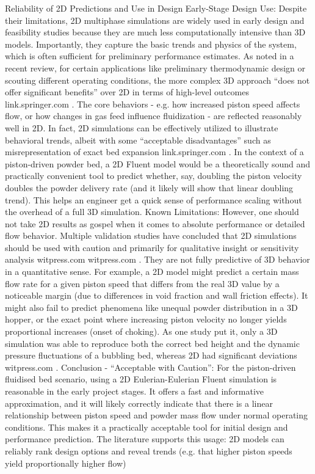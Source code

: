 Reliability of 2D Predictions and Use in Design
Early-Stage Design Use: Despite their limitations, 2D multiphase simulations are widely used in early design and feasibility studies because they are much less computationally intensive than 3D models. Importantly, they capture the basic trends and physics of the system, which is often sufficient for preliminary performance estimates. As noted in a recent review, for certain applications like preliminary thermodynamic design or scouting different operating conditions, the more complex 3D approach “does not offer significant benefits” over 2D in terms of high-level outcomes
link.springer.com
. The core behaviors - e.g. how increased piston speed affects flow, or how changes in gas feed influence fluidization - are reflected reasonably well in 2D. In fact, 2D simulations can be effectively utilized to illustrate behavioral trends, albeit with some “acceptable disadvantages” such as misrepresentation of exact bed expansion
link.springer.com
. In the context of a piston-driven powder bed, a 2D Fluent model would be a theoretically sound and practically convenient tool to predict whether, say, doubling the piston velocity doubles the powder delivery rate (and it likely will show that linear doubling trend). This helps an engineer get a quick sense of performance scaling without the overhead of a full 3D simulation. Known Limitations: However, one should not take 2D results as gospel when it comes to absolute performance or detailed flow behavior. Multiple validation studies have concluded that 2D simulations should be used with caution and primarily for qualitative insight or sensitivity analysis
witpress.com
witpress.com
. They are not fully predictive of 3D behavior in a quantitative sense. For example, a 2D model might predict a certain mass flow rate for a given piston speed that differs from the real 3D value by a noticeable margin (due to differences in void fraction and wall friction effects). It might also fail to predict phenomena like unequal powder distribution in a 3D hopper, or the exact point where increasing piston velocity no longer yields proportional increases (onset of choking). As one study put it, only a 3D simulation was able to reproduce both the correct bed height and the dynamic pressure fluctuations of a bubbling bed, whereas 2D had significant deviations
witpress.com
. Conclusion - “Acceptable with Caution”: For the piston-driven fluidised bed scenario, using a 2D Eulerian-Eulerian Fluent simulation is reasonable in the early project stages. It offers a fast and informative approximation, and it will likely correctly indicate that there is a linear relationship between piston speed and powder mass flow under normal operating conditions. This makes it a practically acceptable tool for initial design and performance prediction. The literature supports this usage: 2D models can reliably rank design options and reveal trends (e.g. that higher piston speeds yield proportionally higher flow)
